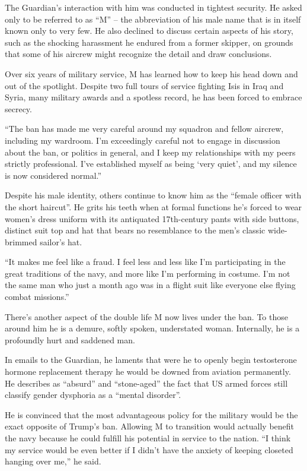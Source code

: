 The Guardian’s interaction with him was conducted in tightest security. He asked only to be referred to as “M” – the abbreviation of his male name that is in itself known only to very few. He also declined to discuss certain aspects of his story, such as the shocking harassment he endured from a former skipper, on grounds that some of his aircrew might recognize the detail and draw conclusions.

Over six years of military service, M has learned how to keep his head down and out of the spotlight. Despite two full tours of service fighting Isis in Iraq and Syria, many military awards and a spotless record, he has been forced to embrace secrecy.

“The ban has made me very careful around my squadron and fellow aircrew, including my wardroom. I’m exceedingly careful not to engage in discussion about the ban, or politics in general, and I keep my relationships with my peers strictly professional. I’ve established myself as being ‘very quiet’, and my silence is now considered normal.”

Despite his male identity, others continue to know him as the “female officer with the short haircut”. He grits his teeth when at formal functions he’s forced to wear women’s dress uniform with its antiquated 17th-century pants with side buttons, distinct suit top and hat that bears no resemblance to the men’s classic wide-brimmed sailor’s hat.

“It makes me feel like a fraud. I feel less and less like I’m participating in the great traditions of the navy, and more like I’m performing in costume. I’m not the same man who just a month ago was in a flight suit like everyone else flying combat missions.”

There’s another aspect of the double life M now lives under the ban. To those around him he is a demure, softly spoken, understated woman. Internally, he is a profoundly hurt and saddened man.

In emails to the Guardian, he laments that were he to openly begin testosterone hormone replacement therapy he would be downed from aviation permanently. He describes as “absurd” and “stone-aged” the fact that US armed forces still classify gender dysphoria as a “mental disorder”.

He is convinced that the most advantageous policy for the military would be the exact opposite of Trump’s ban. Allowing M to transition would actually benefit the navy because he could fulfill his potential in service to the nation. “I think my service would be even better if I didn’t have the anxiety of keeping closeted hanging over me,” he said.

